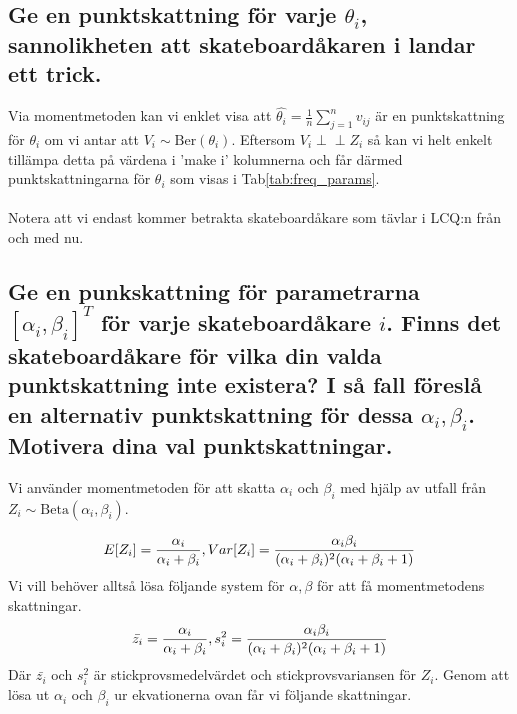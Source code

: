 \documentclass{article}
\newcommand{\independent}{\perp\!\!\!\!\perp}
\begin{document}
\subsection{Ge en punktskattning för varje $\theta_i$, sannolikheten att skateboardåkaren i landar ett trick.}
Via momentmetoden kan vi enklet visa att $\hat{\theta_i} = \frac{1}{n}\sum_{j=1}^n v_{ij}$ är en punktskattning för $\theta_i$ om vi antar att $V_i \sim \text{Ber}(\theta_i)$.
Eftersom $V_i \independent Z_i$ så kan vi helt enkelt tillämpa detta på värdena i 'make i' kolumnerna och får därmed punktskattningarna för $\theta_i$ som visas i Tab\ref{tab:freq_params}. 
\\ \\
Notera att vi endast kommer betrakta skateboardåkare som tävlar i LCQ:n från och med nu.

\subsection{Ge en punkskattning för parametrarna $[\alpha_i, \beta_i]^T$ för varje skateboardåkare $i$. 
Finns det skateboardåkare för vilka din valda punktskattning inte existera? 
I så fall föreslå en alternativ punktskattning för dessa $\alpha_i, \beta_i$. Motivera dina val punktskattningar.}

Vi använder momentmetoden för att skatta $\alpha_i$ och $\beta_i$ med hjälp av utfall från $Z_i \sim \text{Beta}(\alpha_i, \beta_i)$.

\begin{equation*}
    E[Z_i] = \frac{\alpha_i}{\alpha_i + \beta_i}, Var[Z_i] = \frac{\alpha_i\beta_i}{(\alpha_i + \beta_i)^2(\alpha_i + \beta_i + 1)} \\
\end{equation*}
Vi vill behöver alltså lösa följande system för $\alpha, \beta$ för att få momentmetodens skattningar.
\begin{equation*}
    \bar{z_i} = \frac{\alpha_i}{\alpha_i + \beta_i}, s_i^2 = \frac{\alpha_i\beta_i}{(\alpha_i + \beta_i)^2(\alpha_i + \beta_i + 1)} \\
\end{equation*}
Där $\bar{z_i}$ och $s_i^2$ är stickprovsmedelvärdet och stickprovsvariansen för $Z_i$. Genom att lösa ut $\alpha_i$ och $\beta_i$ ur ekvationerna ovan får vi följande skattningar.
\end{document}
